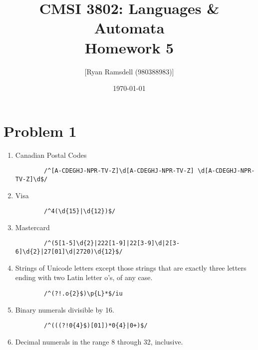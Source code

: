 \documentclass{article}
\title{CMSI 3802: Languages \& Automata \\ Homework 5}
\author{[Ryan Ramsdell (980388983)]}
\date{\today}
\begin{document}
\maketitle

\section*{Problem 1}
\begin{enumerate}[label=(\alph*)]
  \item Canadian Postal Codes
    \begin{shaded}
      \begin{verbatim}
        /^[A-CDEGHJ-NPR-TV-Z]\d[A-CDEGHJ-NPR-TV-Z] \d[A-CDEGHJ-NPR-TV-Z]\d$/
      \end{verbatim}
    \end{shaded}
  \item Visa
    \begin{shaded}
      \begin{verbatim}
        /^4(\d{15}|\d{12})$/
      \end{verbatim}
    \end{shaded}
  \item Mastercard
    \begin{shaded}
      \begin{verbatim}
        /^(5[1-5]\d{2}|222[1-9]|22[3-9]\d|2[3-6]\d{2}|27[01]\d|2720)\d{12}$/
      \end{verbatim}
    \end{shaded}
  \item Strings of Unicode letters except those strings that are exactly three letters ending with two Latin letter o’s, of any case.
    \begin{shaded}
      \begin{verbatim}
        /^(?!.o{2}$)\p{L}*$/iu
      \end{verbatim}
    \end{shaded}
  \item Binary numerals divisible by 16.
    \begin{shaded}
      \begin{verbatim}
        /^(((?!0{4}$)[01])*0{4}|0+)$/
      \end{verbatim}
    \end{shaded}
  \item Decimal numerals in the range 8 through 32, inclusive.
    \begin{shaded}

\end{shaded}
\end{enumerate}
\end{document}
